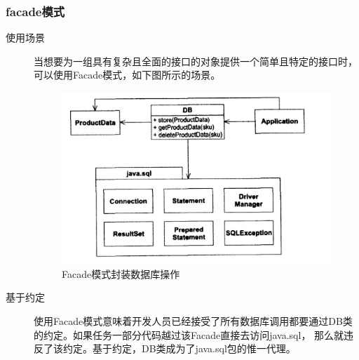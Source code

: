 \documentclass[11pt]{article}
\begin{document}
\subsubsection{facade模式}
\label{sec:orgba62801}
\begin{description}
\item[{使用场景}] 当想要为一组具有复杂且全面的接口的对象提供一个简单且特定的接口时，可以使用Facade模式，如下图所示的场景。
\begin{figure}[htbp]
\centering
\includegraphics[width=.9\linewidth]{./dbFacade.png}
\caption{Facade模式封装数据库操作}
\end{figure}
\item[{基于约定}] 使用Facade模式意味着开发人员已经接受了所有数据库调用都要通过DB类的约定。如果任务一部分代码越过该Facade直接去访问java.sql，
那么就违反了该约定。基于约定，DB类成为了java.sql包的惟一代理。
\end{description}
\end{document}
